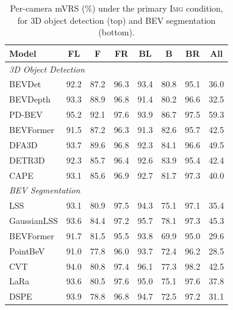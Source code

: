 \begin{table}[h]\centering
\begin{minipage}[t]{0.48\textwidth}\centering
\setlength{\tabcolsep}{4pt}
\begin{tabular}{l cccccc c}
\toprule
Model & FL & F & FR & BL & B & BR & All\\
\midrule
\multicolumn{8}{l}{\textit{3D Object Detection}}\\
\midrule
BEVDet    & 92.2 & 87.2 & 96.3 & 93.4 & 80.8 & 95.1 & 36.0\\
BEVDepth  & 93.3 & 88.9 & 96.8 & 91.4 & 80.2 & 96.6 & 32.5\\
PD-BEV    & 95.2 & 92.1 & 97.6 & 93.9 & 86.7 & 97.5 & 59.3\\
\midrule
BEVFormer & 91.5 & 87.2 & 96.3 & 91.3 & 82.6 & 95.7 & 42.5\\
DFA3D     & 93.7 & 89.6 & 96.8 & 92.3 & 84.1 & 96.6 & 49.5\\
DETR3D    & 92.3 & 85.7 & 96.4 & 92.6 & 83.9 & 95.4 & 42.4\\
\midrule
CAPE      & 93.1 & 85.6 & 96.9 & 92.7 & 81.7 & 97.3 & 40.0\\
\midrule
\multicolumn{8}{l}{\textit{BEV Segmentation}}\\
\midrule
LSS         & 93.1 & 80.9 & 97.5 & 94.3 & 75.1 & 97.1 & 35.4\\
GaussianLSS & 93.6 & 84.4 & 97.2 & 95.7 & 78.1 & 97.3 & 45.3\\
\midrule
BEVFormer & 91.7 & 81.5 & 95.5 & 93.8 & 69.9 & 95.0 & 29.6\\
PointBeV  & 91.0 & 77.8 & 96.0 & 93.7 & 72.4 & 96.2 & 28.5\\
\midrule
CVT  & 94.0 & 80.8 & 97.4 & 96.1 & 77.3 & 98.2 & 42.5\\
LaRa & 93.6 & 80.5 & 97.6 & 95.0 & 75.1 & 97.6 & 37.8\\
DSPE & 93.9 & 78.8 & 96.8 & 94.7 & 72.5 & 97.2 & 31.1\\
\bottomrule
\end{tabular}
\caption{Per-camera mVRS (\%) under the primary \textsc{Img} condition, for 3D object detection (top) and BEV segmentation (bottom).}

\end{minipage}
\end{table}
